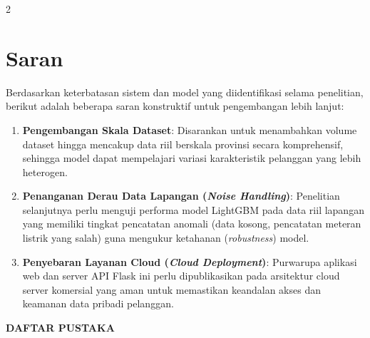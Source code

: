 \documentclass[12pt, a4paper, onecolumn, oneside]{report}
\begin{document}
\begin{spacing}{2}
\section{Saran}
Berdasarkan keterbatasan sistem dan model yang diidentifikasi selama penelitian, berikut adalah beberapa saran konstruktif untuk pengembangan lebih lanjut:
\begin{enumerate}
    \item \textbf{Pengembangan Skala Dataset}:
    Disarankan untuk menambahkan volume dataset hingga mencakup data riil berskala provinsi secara komprehensif, sehingga model dapat mempelajari variasi karakteristik pelanggan yang lebih heterogen.
    \item \textbf{Penanganan Derau Data Lapangan (\textit{Noise Handling})}:
    Penelitian selanjutnya perlu menguji performa model LightGBM pada data riil lapangan yang memiliki tingkat pencatatan anomali (data kosong, pencatatan meteran listrik yang salah) guna mengukur ketahanan (\textit{robustness}) model.
    \item \textbf{Penyebaran Layanan Cloud (\textit{Cloud Deployment})}:
    Purwarupa aplikasi web dan server API Flask ini perlu dipublikasikan pada arsitektur cloud server komersial yang aman untuk memastikan keandalan akses dan keamanan data pribadi pelanggan.
\end{enumerate}

\end{spacing}

\newpage
{}
{}
\begin{center}
{\large\bfseries DAFTAR PUSTAKA}
\end{center}
\end{document}
